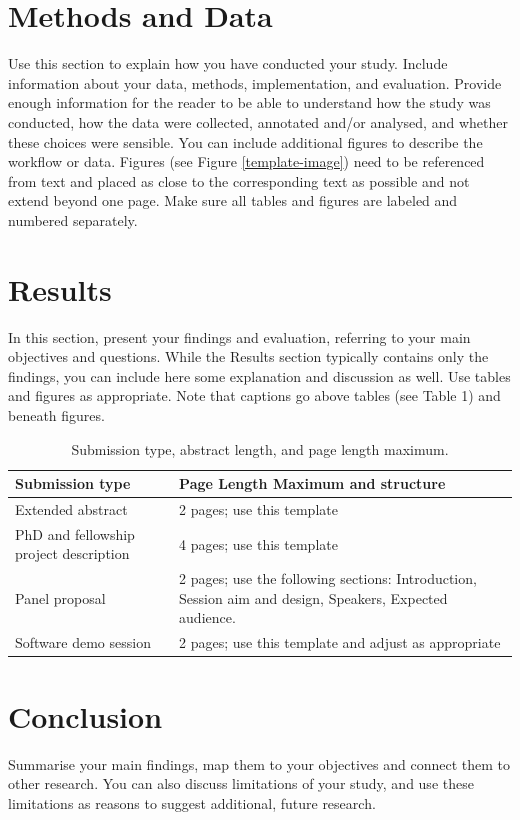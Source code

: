 \documentclass[11pt]{article}
\begin{document}
\section{Methods and Data}
Use this section to explain how you have conducted your study. Include information about your data, methods, implementation, and evaluation. Provide enough information for the reader to be able to understand how the study was conducted, how the data were collected, annotated and/or analysed, and whether these choices were sensible. 
You can include additional figures to describe the workflow or data. Figures (see Figure \ref{template-image}) need to be referenced from text and placed as close to the corresponding text as possible and not extend beyond one page. Make sure all tables and figures are labeled and numbered separately.

\section{Results}
In this section, present your findings and evaluation, referring to your main objectives and questions. While the Results section typically contains only the findings, you can include here some explanation and discussion as well. Use tables and figures as appropriate. Note that captions go above tables (see Table 1) and beneath figures. 

\begin{table}[h!]

\caption{Submission type, abstract length, and page length maximum.}
\label{sub-type}
\begin{tabular}{ |p{6cm}|p{8cm}| } 
 \hline
 \textbf{Submission type} & \textbf{Page Length Maximum and structure}  \\ 
 \hline
Extended abstract  & 2 pages; use this template \\
 \hline
 PhD and fellowship project description & 4 pages; use this template \\
 \hline
 Panel proposal & 2 pages; use the following sections: Introduction, Session aim and design, Speakers, Expected audience. \\
 \hline
 Software demo session & 2 pages; use this template and adjust as appropriate \\
 \hline
\end{tabular}
\end{table}


\section{Conclusion}
Summarise your main findings, map them to your objectives and connect them to other research. You can also discuss limitations of your study, and use these limitations as reasons to suggest additional, future research.
\end{document}
